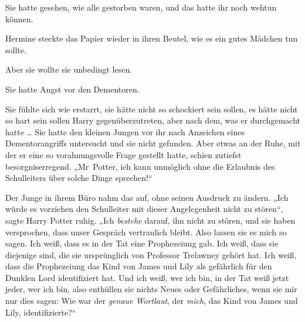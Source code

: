Sie hatte gesehen, wie alle gestorben waren, und das hatte ihr noch wehtun können.

Hermine steckte das Papier wieder in ihren Beutel, wie es ein gutes Mädchen tun sollte.

Aber sie wollte sie unbedingt lesen.

Sie hatte Angst vor den Dementoren.


Sie fühlte sich wie erstarrt, sie hätte nicht so schockiert sein sollen, es hätte nicht so hart sein sollen Harry gegenüberzutreten, aber nach dem, was er durchgemacht hatte … Sie hatte den kleinen Jungen vor ihr nach Anzeichen eines Dementorangriffs untersucht und sie nicht gefunden. Aber etwas an der Ruhe, mit der er eine so vorahnungsvolle Frage gestellt hatte, schien zutiefst besorgniserregend.
„Mr~Potter, ich kann unmöglich ohne die Erlaubnis des Schulleiters über solche Dinge sprechen!“

Der Junge in ihrem Büro nahm das auf, ohne seinen Ausdruck zu ändern.
„Ich würde es vorziehen den Schulleiter mit dieser Angelegenheit nicht zu stören“, sagte Harry Potter ruhig.
„Ich \emph{bestehe} darauf, ihn nicht zu stören, und sie haben versprochen, dass unser Gespräch vertraulich bleibt. Also lassen sie es mich so sagen. Ich weiß, dass es in der Tat eine Prophezeiung gab. Ich weiß, dass sie diejenige sind, die sie ursprünglich von Professor Trelawney gehört hat. Ich weiß, dass die Prophezeiung das Kind von James und Lily als gefährlich für den Dunklen Lord identifiziert hat. Und ich weiß, wer ich bin, in der Tat weiß jetzt jeder, wer ich bin, also enthüllen sie nichts Neues oder Gefährliches, wenn sie mir nur dies sagen: Wie war der \emph{genaue Wortlaut}, der \emph{mich}, das Kind von James und Lily, identifizierte?“

